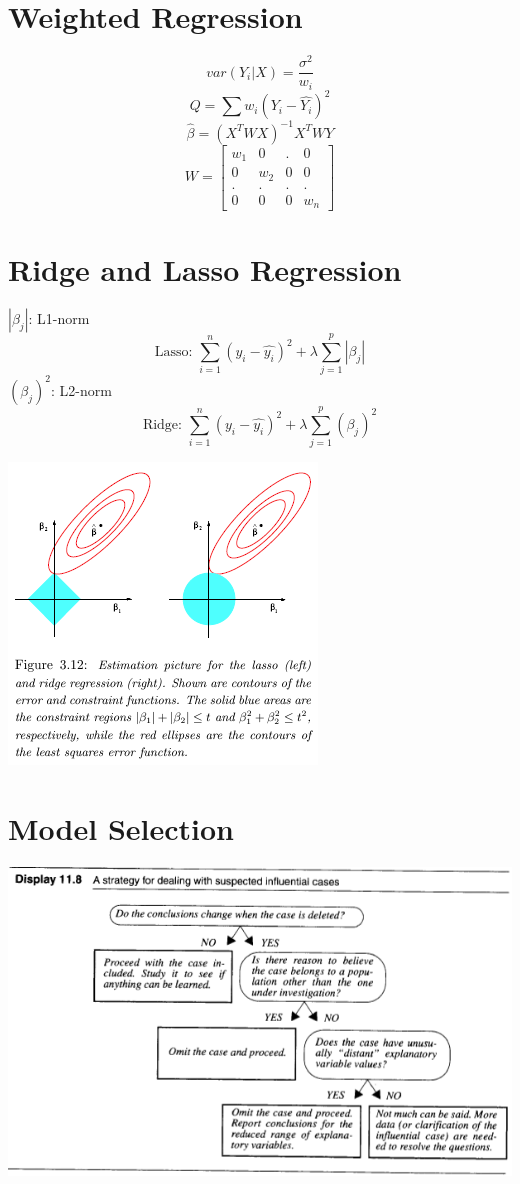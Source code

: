 \documentclass[10pt,landscape, fleqn]{article}
\begin{document}
\begin{multicols}{3}
		\section{Weighted Regression}
			\[ var(Y_i|X) = \frac{\sigma^2}{w_i} \]
			\[ Q = \sum w_i(Y_i-\hat{Y_i})^2 \]
			\[ \hat{\beta} = (X^TWX)^{-1}X^TWY \]
			\[ W = \left[ 
				\begin{array}{cccc}
					w_1 & 0 & . & 0 \\
					0 & w_2 & 0 & 0 \\
					. & . & . & . \\
					0 & 0 & 0 & w_n
				\end{array}
				\right] \]
		
		\section{Ridge and Lasso Regression}
			$|\beta_j|$: L1-norm
			\[ \mbox{Lasso: } \sum_{i=1}^{n}(y_i- \hat{y_i})^2 + \lambda\sum_{j=1}^{p}|\beta_j| \]
			$(\beta_j)^2$: L2-norm
			\[ \mbox{Ridge: } \sum_{i=1}^{n}(y_i- \hat{y_i})^2 + \lambda\sum_{j=1}^{p}(\beta_j)^2 \]
			\begin{center}
				\includegraphics[width=0.7\linewidth]{regularization}
			\end{center}

		\section{Model Selection}
			\includegraphics[width=0.95\linewidth]{mlr1}

\end{multicols}
\end{document}
